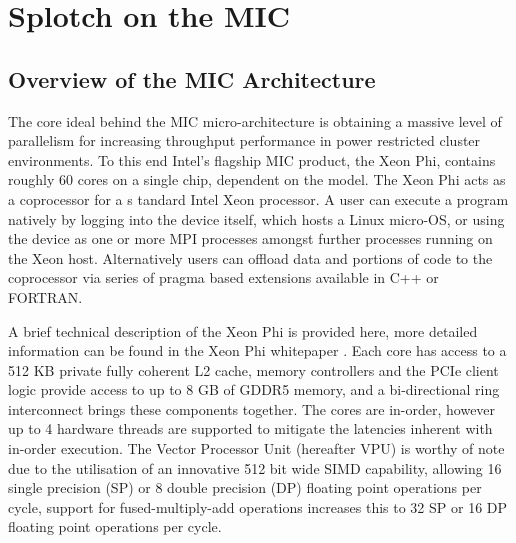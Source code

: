 \documentclass[runningheads,a4paper]{llncs}
\begin{document}



\section{Splotch on the MIC}
\label{sect:micsplotch}


\subsection{Overview of the MIC Architecture}
\label{sect:mic}

The core ideal behind the MIC micro-architecture is obtaining a massive level of parallelism for increasing throughput 
performance in power restricted cluster environments. To this end Intel's flagship MIC product, the Xeon Phi, 
contains roughly 60 cores on a single chip, dependent on the model. The Xeon Phi acts as a coprocessor for a s
tandard Intel Xeon processor. A user can execute a program natively by logging into the device itself, which hosts 
a Linux micro-OS, or using the device as one or more MPI processes amongst further processes running on the 
Xeon host. Alternatively users can offload data and portions of code to the coprocessor via series of pragma 
based extensions available in C++ or FORTRAN.

A brief technical description of the Xeon Phi is provided here, more detailed information can be found in the 
Xeon Phi whitepaper \cite{xeonphi}. Each core has access to a 512 KB private fully coherent L2 cache, memory controllers 
and the PCIe client logic provide access to up to 8 GB of GDDR5 memory, and a bi-directional ring interconnect 
brings these components together. The cores are in-order, however up to 4 hardware threads are supported to mitigate 
the latencies inherent with in-order execution. The Vector Processor Unit (hereafter VPU) is worthy of note due to 
the utilisation of an innovative 512 bit wide SIMD capability, allowing 16 single precision (SP) or 8 double precision 
(DP) floating point operations per cycle, support for fused-multiply-add operations increases this to 32 SP or 16 DP 
floating point operations per cycle. 
\end{document}
